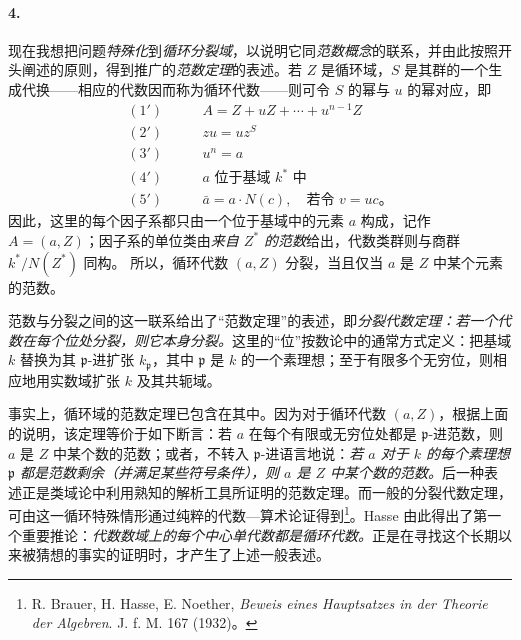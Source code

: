 \documentclass[11pt]{article}
\begin{document}
\paragraph{4.}
现在我想把问题\emph{特殊化}到\emph{循环分裂域}，以说明它同\emph{范数概念}的联系，并由此按照开头阐述的原则，得到推广的\emph{范数定理}的表述。若 \(Z\) 是循环域，\(S\) 是其群的一个生成代换——相应的代数因而称为循环代数——则可令 \(S\) 的幂与 \(u\) 的幂对应，即
\[
\begin{aligned}
(1')\qquad &A=Z+uZ+\cdots+u^{n-1}Z\\
(2')\qquad &zu=uz^S\\
(3')\quad &u^n=a\\
(4')\quad &a\text{ 位于基域 }k^\ast\text{ 中}\\
(5')\quad &\bar a=a\cdot N(c),\quad \text{若令 }v=uc\text{。}
\end{aligned}
\]
因此，这里的每个因子系都只由一个位于基域中的元素 \(a\) 构成，记作 \(A=(a,Z)\)；因子系的单位类由\emph{来自 \(Z^\ast\) 的范数}给出，代数类群则与商群 \(k^\ast/N(Z^\ast)\) 同构。
所以，循环代数 \((a,Z)\) 分裂，当且仅当 \(a\) 是 \(Z\) 中某个元素的范数。

范数与分裂之间的这一联系给出了“范数定理”的表述，即\emph{分裂代数定理：若一个代数在每个位处分裂，则它本身分裂。}这里的“位”按数论中的通常方式定义：把基域 \(k\) 替换为其 \(\mathfrak p\)-进扩张 \(k_{\mathfrak p}\)，其中 \(\mathfrak p\) 是 \(k\) 的一个素理想；至于有限多个无穷位，则相应地用实数域扩张 \(k\) 及其共轭域。

事实上，循环域的范数定理已包含在其中。因为对于循环代数 \((a,Z)\)，根据上面的说明，该定理等价于如下断言：若 \(a\) 在每个有限或无穷位处都是 \(\mathfrak p\)-进范数，则 \(a\) 是 \(Z\) 中某个数的范数；或者，不转入 \(\mathfrak p\)-进语言地说：\emph{若 \(a\) 对于 \(k\) 的每个素理想 \(\mathfrak p\) 都是范数剩余（并满足某些符号条件），则 \(a\) 是 \(Z\) 中某个数的范数。}后一种表述正是类域论中利用熟知的解析工具所证明的范数定理。而一般的分裂代数定理，可由这一循环特殊情形通过纯粹的代数—算术论证得到\footnote{R. Brauer, H. Hasse, E. Noether, \emph{Beweis eines Hauptsatzes in der Theorie der Algebren}. J. f. M. 167 (1932)。}。Hasse 由此得出了第一个重要推论：\emph{代数数域上的每个中心单代数都是循环代数。}正是在寻找这个长期以来被猜想的事实的证明时，才产生了上述一般表述。
\end{document}

